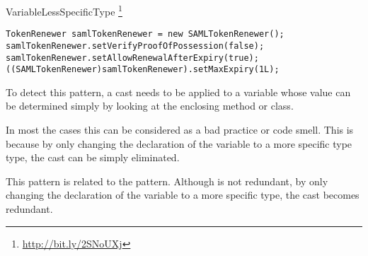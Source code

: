 \begin{pattern}{VariableLessSpecificType}
\footnote{\url{http://bit.ly/2SNoUXj}}

\begin{verbatim}
TokenRenewer samlTokenRenewer = new SAMLTokenRenewer();
samlTokenRenewer.setVerifyProofOfPossession(false);
samlTokenRenewer.setAllowRenewalAfterExpiry(true);
((SAMLTokenRenewer)samlTokenRenewer).setMaxExpiry(1L);
\end{verbatim}

\detection{}
To detect this pattern, a cast needs to be applied to a variable whose
value can be determined simply by looking at
the enclosing method or class.

\discussion{}
In most the cases this can be considered as a bad practice or
code smell.
This is because by only changing the declaration of the variable
to a more specific type type, the cast can be simply eliminated.

\related{}
This pattern is related to the  pattern.
Although \thisp{} is not redundant,
by only changing the declaration of the variable to a more specific type,
the cast becomes redundant.

\end{pattern}